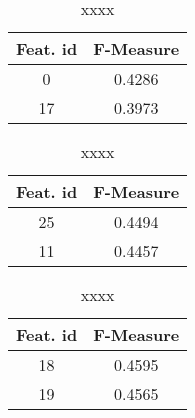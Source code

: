 \documentclass[12pt]{article}
\begin{document}
\begin{table}
	\centering
			\begin{minipage}[b]{0.32\hsize}\centering
				\begin{tabular}{ | c | c |}
					\hline
					\textbf{Feat. id} & \textbf{F-Measure} \\ \hline
					0 & 0.4286 \\ \hline
					17 & 0.3973 \\ \hline
				\end{tabular}
				\caption{xxx}
				\label{tab:singlebest}
			\end{minipage}
			\hfill
			\begin{minipage}[b]{0.32\hsize}\centering
				\begin{tabular}{ | c | c |}
					\hline
					\textbf{Feat. id} & \textbf{F-Measure} \\ \hline
					25 & 0.4494 \\ \hline
					11 & 0.4457 \\ \hline
				\end{tabular}
				\caption{xxxx}
				\label{tab:twobest}
			\end{minipage}
			\hfill
			\begin{minipage}[b]{0.32\hsize}\centering
				\begin{tabular}{ | c | c |}
					\hline
					\textbf{Feat. id} & \textbf{F-Measure} \\ \hline
					18 & 0.4595 \\ \hline
					19 & 0.4565 \\ \hline
				\end{tabular}
				\caption{xxxx}
				\label{tab:threebest}
			\end{minipage}%
	\end{table}
\end{document}

